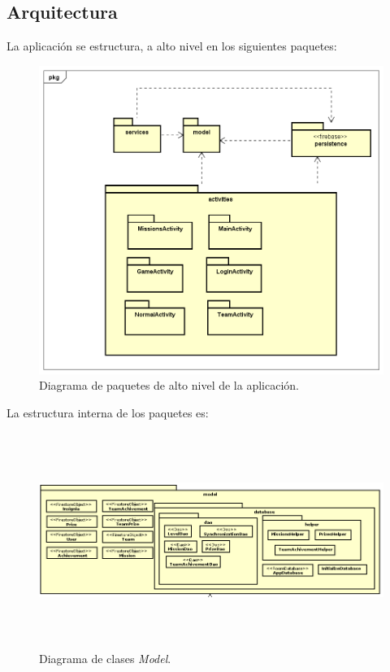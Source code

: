 \documentclass[twoside]{report}
\begin{document}
\subsection{Arquitectura}
La aplicación se estructura, a alto nivel en los siguientes paquetes:
\begin{figure}[H]
\centering
\includegraphics[scale=0.5]{images/structureHighLevel}
\caption{Diagrama de paquetes de alto nivel de la aplicación.}
\end{figure}

\clearpage

La estructura interna de los paquetes es:

\begin{figure}[H]
\centering
\includegraphics[height=7cm,width=\textwidth]{images/structureModel.PNG}
\caption{Diagrama de clases \textit{Model}.}
\end{figure}
\end{document}
